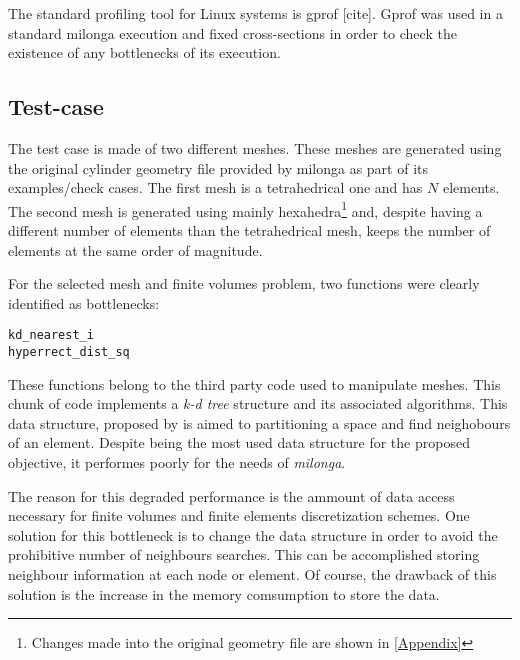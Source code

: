 \documentclass{anstrans}
\begin{document}
The standard profiling tool for Linux systems is gprof [cite]. Gprof was used in a standard milonga
execution
and fixed cross-sections in order to check
the existence of any bottlenecks of its execution.

\subsection{Test-case}

The test case is made of two different meshes. These meshes are generated using the original cylinder geometry file
provided by milonga as part of its examples/check cases. The first mesh is a tetrahedrical one and has $N$
elements. The second mesh is generated using mainly hexahedra\footnote{Changes made into the original
  geometry file are shown in \ref{Appendix}} and, despite having a different number of elements than
the tetrahedrical mesh, keeps the number of elements at the same order of magnitude.


For the selected mesh and finite volumes problem, two functions were clearly identified as bottlenecks:
\begin{verbatim}
kd_nearest_i
hyperrect_dist_sq
\end{verbatim}

These functions belong to the third party code used to manipulate meshes. This chunk of code implements
a \textit{k-d tree} structure and its associated algorithms. This data structure, proposed by \cite{Bentley1975}
is aimed to partitioning a space and find neighobours of an element. Despite being the most used data
structure for the proposed objective, it performes poorly for the needs of \textit{milonga}.

The reason for this degraded performance is the ammount of data access necessary for finite volumes
and finite elements discretization schemes. One solution for this bottleneck is to change the data structure
in order to avoid the prohibitive number of neighbours searches. This can be accomplished storing neighbour
information at each node or element. Of course, the drawback of this solution is the increase in the memory
comsumption to store the data.

%
\end{document}
